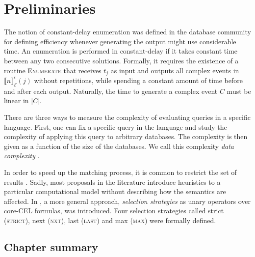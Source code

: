 \chapter{Preliminaries}\label{chapter:preliminaries}


The notion of constant-delay enumeration was defined in the database community \cite{constant-delay-1 , constant-delay-2} for defining efficiency whenever generating the output might use considerable time. An enumeration is performed in constant-delay if it takes constant time between any two consecutive solutions. Formally, it requires the existence of a routine \textsc{Enumerate} that receives $t_{j}$ as input and outputs all complex events in $\llbracket n \rrbracket^{\epsilon}_{\mathcal{E}}(j)$ without repetitions, while spending a constant amount of time before and after each output. Naturally, the time to generate a complex event $C$ must be linear in $|C|$.

There are three ways to measure the complexity of evaluating queries in a specific language. First, one can fix a specific query in the language and study the complexity of applying this query to arbitrary databases. The complexity is then given as a function of the size of the databases. We call this complexity \emph{data complexity} \cite{data-complexity}.


In order to speed up the matching process, it is common to restrict the set of results \cite{10.1016/j.scico.2010.06.010, 10.1145/1142473.1142520, Zhang2014OnCA}. Sadly, most proposals in the literature introduce heuristics to a particular computational model without describing how the semantics are affected. In \cite{formal-framework-cer}, a more general approach, \emph{selection strategies} as unary operators over core-CEL formulas, was introduced. Four selection strategies called strict (\textsc{strict}), next (\textsc{nxt}), last (\textsc{last}) and max (\textsc{max}) were formally defined.

\section{Chapter summary}
